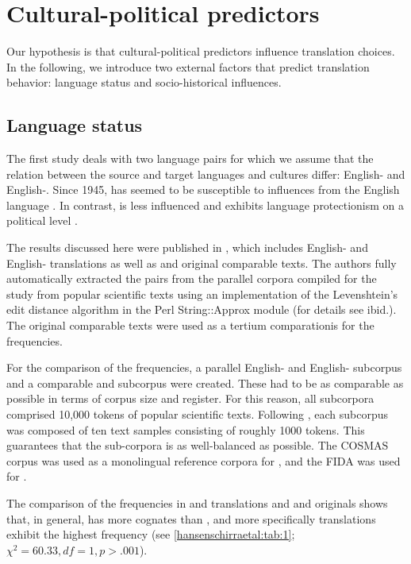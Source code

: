 \documentclass[output=paper]{LSP/langsci}
\begin{document}
\section{Cultural-political predictors}\label{hansenschirraetal:sec:2}
Our hypothesis is that cultural-political predictors influence translation choices. In the following, we introduce two external factors that predict translation behavior: language status and socio-historical influences.

\subsection{Language status}\label{hansenschirraetal:sec:2.1}
The first study deals with two language pairs for which we assume that the relation between the source and target languages and cultures differ: English- and English-. Since 1945,  has seemed to be susceptible to influences from the English language \citep{Carstensen1965}. In contrast,  is less influenced and exhibits language protectionism on a political level \citep{VintarHansenSchirra2005}.

The results discussed here were published in \citet{VintarHansenSchirra2005}, which includes English- and English- translations as well as  and  original comparable texts. The authors fully automatically extracted the  pairs from the parallel corpora compiled for the study from popular scientific texts using an implementation of the Levenshtein's edit distance algorithm in the Perl String::Approx module (for details see ibid.). The original comparable texts were used as a tertium comparationis for the  frequencies.

For the comparison of the  frequencies, a parallel English- and English- subcorpus and a comparable  and  subcorpus were created. These had to be as comparable as possible in terms of corpus size and register. For this reason, all subcorpora comprised 10,000 tokens of popular scientific texts. Following \citet{Biber1995}, each subcorpus was composed of ten text samples consisting of roughly 1000 tokens. This guarantees that the sub-corpora is as well-balanced as possible. The COSMAS corpus was used as a monolingual reference corpora for , and the FIDA was used for  \citep{VintarHansenSchirra2005}.

The comparison of the  frequencies in  and  translations and  and  originals shows that, in general,  has more cognates than , and more specifically  translations exhibit the highest  frequency (see \ref{hansenschirraetal:tab:1}; $\chi^{2}=60.33, df= 1, p>.001$).
\end{document}
